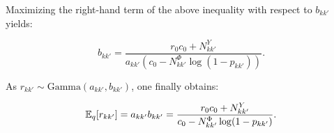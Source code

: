 Maximizing the right-hand term of the above inequality with respect to $b_{kk'}$ yields:

\begin{equation} \label{eq:update2}
b_{kk'} = \frac{r_0 c_0 + N^Y_{kk'}}{a_{kk'} (c_0 - N^\Phi_{kk'} \log(1-p_{kk'}))}. \nonumber
\end{equation}

As $r_{kk'} \sim \textrm{Gamma}(a_{kk'},b_{kk'})$, one finally obtains:

\begin{equation}
\mathbb{E}_q[r_{kk'}] = a_{kk'} b_{kk'} = \frac{r_0 c_0 + N^Y_{kk'}}{c_0 - N^\Phi_{kk'} \log(1-p_{kk'})}. \nonumber
\end{equation}


%
%
%
%
%
%


